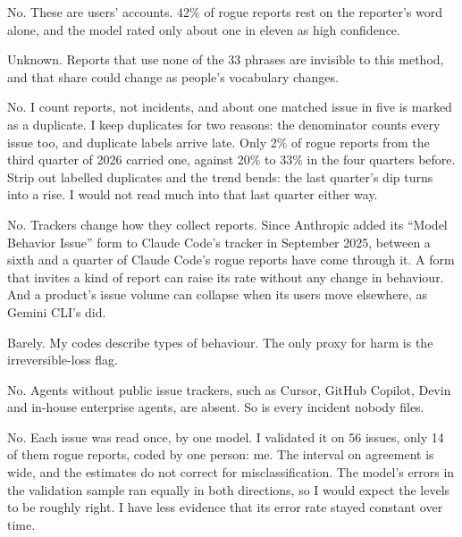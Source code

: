  No. These are users’ accounts. 42\% of rogue reports rest on the reporter’s word alone, and the model rated only about one in eleven as high confidence.

 Unknown. Reports that use none of the 33 phrases are invisible to this method, and that share could change as people’s vocabulary changes.

 No. I count reports, not incidents, and about one matched issue in five is marked as a duplicate. I keep duplicates for two reasons: the denominator counts every issue too, and duplicate labels arrive late. Only 2\% of rogue reports from the third quarter of 2026 carried one, against 20\% to 33\% in the four quarters before. Strip out labelled duplicates and the trend bends: the last quarter’s dip turns into a rise. I would not read much into that last quarter either way.

 No. Trackers change how they collect reports. Since Anthropic added its “Model Behavior Issue” form to Claude Code’s tracker in September 2025, between a sixth and a quarter of Claude Code’s rogue reports have come through it. A form that invites a kind of report can raise its rate without any change in behaviour. And a product’s issue volume can collapse when its users move elsewhere, as Gemini CLI’s did.

 Barely. My codes describe types of behaviour. The only proxy for harm is the irreversible-loss flag.

 No. Agents without public issue trackers, such as Cursor, GitHub Copilot, Devin and in-house enterprise agents, are absent. So is every incident nobody files.

 No. Each issue was read once, by one model. I validated it on 56 issues, only 14 of them rogue reports, coded by one person: me. The interval on agreement is wide, and the estimates do not correct for misclassification. The model’s errors in the validation sample ran equally in both directions, so I would expect the levels to be roughly right. I have less evidence that its error rate stayed constant over time.


